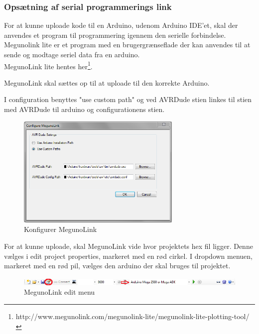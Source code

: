 \newpage

\subsubsection*{Opsætning af serial programmerings link}

For at kunne uploade kode til en Arduino, udenom Arduino IDE'et, skal der anvendes et program til programmering igennem den serielle forbindelse.
Megunolink lite er et program med en brugergrænseflade der kan anvendes til at sende og modtage seriel data fra en arduino.\\
MegunoLink lite hentes her\footnote{http://www.megunolink.com/megunolink-lite/megunolink-lite-plotting-tool/}.

MegunoLink skal sættes op til at uploade til den korrekte Arduino. 

I configuration benyttes "use custom path" og ved AVRDude stien linkes til stien med AVRDude til arduino og configurationens stien. 

\begin{figure}[H]
	\centering
	\includegraphics[width=0.7\textwidth]{Billeder/implementation/Howtoguide/megunolink_config.png}
	\caption{Konfigurer MegunoLink}
	\label{fig:Konfigurer_MegunoLink}
\end{figure}

For at kunne uploade, skal MegunoLink vide hvor projektets hex fil ligger. Denne vælges i edit project properties, markeret med en rød cirkel.
I dropdown menuen, markeret med en rød pil, vælges den arduino der skal bruges til projektet.

\begin{figure}[H]
	\centering
	\includegraphics[width=1\textwidth]{Billeder/implementation/Howtoguide/meguno_bar.png}
	\caption{MegunoLink edit menu}
	\label{fig:MegunoLink}
\end{figure}






